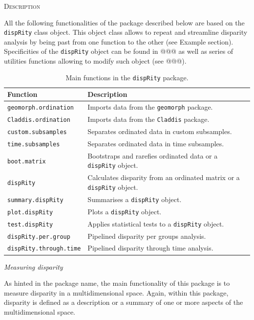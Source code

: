 \documentclass[12pt,letterpaper]{article}
\renewcommand{\section}[1]{%
\bigskip
\begin{center}
\begin{Large}
\normalfont\scshape #1
\medskip
\end{Large}
\end{center}}
\renewcommand{\subsection}[1]{%
\bigskip
\begin{center}
\begin{large}
\normalfont\itshape #1
\end{large}
\end{center}}
\newcommand{\disp}{\texttt{dispRity} }
\begin{document}
\section{Description}
All the following functionalities of the package described below are based on the \disp class object.
This object class allows to repeat and streamline disparity analysis by being past from one function to the other (see Example section).
Specificities of the \disp object can be found in @@@ as well as series of utilities functions allowing to modify such object (see @@@).

\begin{table}
    \begin{tabular}{ll}
        \hline
        Function & Description \\ 
        \hline
        \texttt{geomorph.ordination} & Imports data from the \texttt{geomorph} package. \\
        \texttt{Claddis.ordination} & Imports data from the \texttt{Claddis} package. \\
        \texttt{custom.subsamples} & Separates ordinated data in custom subsamples. \\
        \texttt{time.subsamples} & Separates ordinated data in time subsamples. \\
        \texttt{boot.matrix} & Bootstraps and rarefies ordinated data or a \disp object. \\
        \disp & Calculates disparity from an ordinated matrix or a \disp object. \\
        \texttt{summary.dispRity} & Summarises a \disp object. \\
        \texttt{plot.dispRity} & Plots a \disp object. \\
        \texttt{test.dispRity} & Applies statistical tests to a \disp object.\\
        \texttt{dispRity.per.group} & Pipelined disparity per groups analysis. \\
        \texttt{dispRity.through.time} & Pipelined disparity through time analysis. \\
        \hline
    \end{tabular}
    \caption{Main functions in the \disp package.}
\end{table}


\subsection{Measuring disparity}
As hinted in the package name, the main functionality of this package is to measure disparity in a multidimensional space.
Again, within this package, disparity is defined as a description or a summary of one or more aspects of the multidimensional space.
\end{document}
